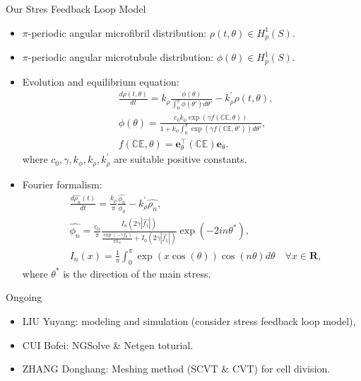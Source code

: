 \documentclass[9pt,UTF8,aspectratio=43]{beamer}
\begin{document}
\begin{frame}{Our Stres Feedback Loop Model}
\begin{itemize}
\item $\pi$-periodic angular microfibril distribution: $\rho(t,\theta) \in H^{1} _{p} (S)$.
\item $\pi$-periodic angular microtubule distribution: $\phi(\theta) \in H^{1} _{p} (S)$.
\item Evolution and equilibrium equation:
\begin{align}
& \frac{d \rho (t, \theta)}{d t}  = k_\rho \frac{\phi(\theta)}{\int_0^\pi \phi(\theta') d \theta'}  - k_\rho^{'}\rho(t, \theta),\\
& \phi(\theta)  = \frac{c_0 k_\phi \exp(\gamma f(\mathbb{C} \mathbb{E}, \theta))}{1 + k_\phi \int_0^\pi \exp(\gamma f(\mathbb{C}\mathbb{E},\theta')) d \theta'}, \\
& f(\mathbb{C}  \mathbb{E}, \theta)  = \bm{e}_\theta^{\top}   \left (\mathbb{C}  \mathbb{E} \right)  \bm{e}_\theta.
\end{align}
where $c_0, \gamma, k_\phi, k_\rho, k_\rho^{'}$ are suitable positive constants.
\item Fourier formalism:
\begin{align}
& \frac{ d \widehat{\rho_{n}}(t) }{ d t } = \frac{ k_{\rho}  }{ \pi } \frac{ \widehat{\phi_{n} } }{ {\phi_{0} } } - k_{\rho} ^{'} \widehat{\rho_{n} }, \\
& \widehat{\phi_{n}} = \frac{ c_0 }{ \pi } \frac{ I_{n} \left(2 \gamma \left|\widehat{f_1}\right|\right) }{ \frac{ \exp(-\gamma f_0) }{ \pi k_{\phi}  } + I_0 \left( 2 \gamma \left| \widehat{f_1} \right|\right)  } \exp(-2in\theta^*), \\
& I_{n} (x) = \frac{ 1 }{ \pi } \int_{0} ^\pi \exp(x \cos(\theta)) \cos ( n \theta )d \theta \quad \forall x \in \mathbf{R},
\end{align}
where $\theta^*$ is the direction of the main stress.
\end{itemize}
\end{frame}

\begin{frame}{Ongoing}
\begin{itemize}
\item LIU Yuyang: modeling and simulation (consider stress feedback loop model),
\item CUI Bofei: NGSolve \& Netgen toturial.
\item ZHANG Donghang: Meshing method (SCVT \& CVT) for cell division.
\end{itemize}
\end{frame}
\end{document}
